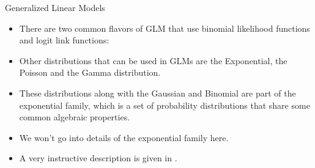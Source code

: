\documentclass[handout]{beamer}
\begin{document}
\begin{frame}{Generalized Linear Models}
\scriptsize{
\begin{itemize}

\item There are two common flavors of GLM that use binomial likelihood functions and logit link functions:


\item Other distributions that can be used in GLMs are the Exponential, the Poisson and the Gamma distribution.

\item These distributions along with the Gaussian and Binomial are part of the exponential family, which is a set of probability distributions that share some common algebraic properties.

\item We won't go into details of the exponential family here.

\item A very instructive description is given in \cite{ng2012cs229}.

\end{itemize}


}

\end{frame}
\end{document}
